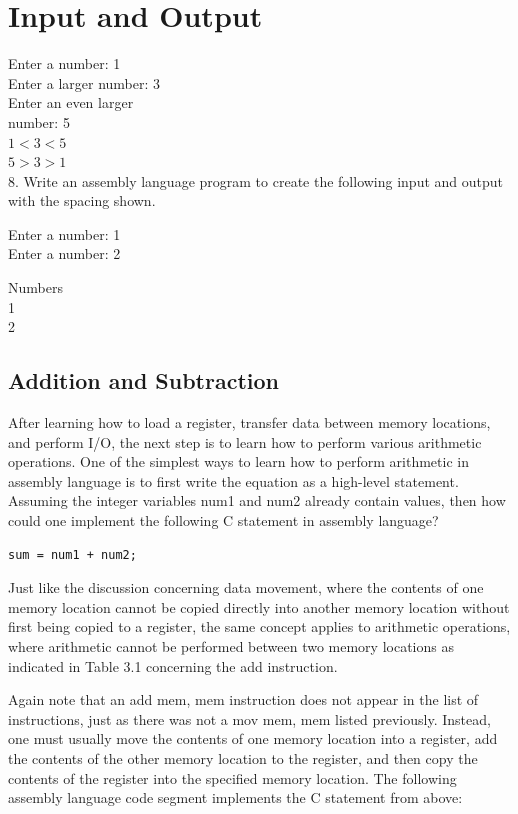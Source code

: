 \documentclass[10pt]{book}
\begin{document}
\section{Input and Output}
Enter a number: 1\\
Enter a larger number: 3\\
Enter an even larger\\
number: 5\\
$1<3<5$\\
$5>3>1$\\
8. Write an assembly language program to create the following input and output with the spacing shown.

Enter a number: 1\\
Enter a number: 2

Numbers\\
1\\
2

\subsection{Addition and Subtraction}
After learning how to load a register, transfer data between memory locations, and perform I/O, the next step is to learn how to perform various arithmetic operations. One of the simplest ways to learn how to perform arithmetic in assembly language is to first write the equation as a high-level statement. Assuming the integer variables num1 and num2 already contain values, then how could one implement the following C statement in assembly language?


\begin{verbatim}
sum = num1 + num2;
\end{verbatim}

Just like the discussion concerning data movement, where the contents of one memory location cannot be copied directly into another memory location without first being copied to a register, the same concept applies to arithmetic operations, where arithmetic cannot be performed between two memory locations as indicated in Table 3.1 concerning the add instruction.

Again note that an add mem, mem instruction does not appear in the list of instructions, just as there was not a mov mem, mem listed previously. Instead, one must usually move the contents of one memory location into a register, add the contents of the other memory location to the register, and then copy the contents of the register into the specified memory location. The following assembly language code segment implements the C statement from above:
\end{document}
